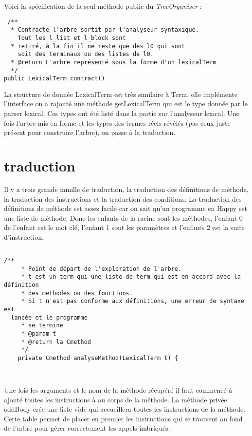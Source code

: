 

Voici la spécification de la seul méthode public du \textit{TreeOrganiser} :
\begin{verbatim}
 /**
  * Contracte l'arbre sortit par l'analyseur syntaxique. 
    Tout les l_list et l_block sont
  * retiré, à la fin il ne reste que des l0 qui sont 
    soit des terminaux ou des listes de l0.
  * @return L'arbre représenté sous la forme d'un lexicalTerm
  */
public LexicalTerm contract()
\end{verbatim}

La structure de donnée LexicalTerm est très similaire à Term, elle implémente l'interface on a rajouté une méthode getLexicalTerm
qui est le type donnée par le parser lexical. Ces types ont été listé dans la partie sur l'analyseur lexical. Une fois 
l'arbre mis en forme et les types des termes réels révélés (pas ceux juste présent pour construire l'arbre), on passe à la traduction.

\section{traduction}
Il y a trois grande famille de traduction, la traduction des définitions de méthode, la traduction des instructions et la traduction des conditions.
La traduction des définitions de méthode est assez facile car on sait qu'un programme en Happy est une liste de méthode. Donc les enfants
de la racine sont les méthodes, l'enfant 0 de l'enfant est le mot clé, l'enfant 1 sont les paramètres et l'enfants 2 est la suite d'instruction.
\begin{verbatim}

/**
	 * Point de départ de l'exploration de l'arbre. 
	 * t est un term qui une liste de term qui est en accord avec la définition
	 * des méthodes ou des fonctions.
	 * Si t n'est pas conforme aux définitions, une erreur de syntaxe est 
  lancée et le programme
	 * se termine
	 * @param t 
	 * @return la Cmethod 
	 */
	private Cmethod analyseMethod(LexicalTerm t) { 

 
\end{verbatim}

Une fois les arguments et le nom de la méthode récupéré il faut commencé à ajouté toutes les instructions à au corps de la méthode.
La méthode privée addBody crée une liste vide qui accueillera toutes les instructions de la méthode. Cette table permet de placer en premier
les instructions qui se trouvent au fond de l'arbre pour gérer correctement les appels imbriqués.

